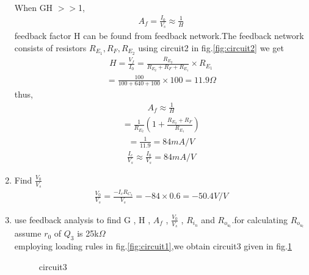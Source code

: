 \begin{enumerate}[label=\thesubsection.\arabic*.,ref=\thesubsection.\theenumi]
\\
\solution When GH $>>$1,
\begin{align}
    A_f =\frac{I_0}{V_s}\approx \frac{1}{H}
\end{align}
feedback factor H can be found from feedback network.The feedback network consists of resistors $R_E_1,R_F,R_E_2$
using circuit2 in  fig.\ref{fig:circuit2} we get
\begin{align}
    H=\frac{V_f}{I_0}=\frac{R_E_2}{R_E_2+R_F+R_E_1} \times R_E_1
\end{align}
\begin{align}
    =\frac{100}{100+640+100}\times 100=11.9\Omega
\end{align}
thus,
\begin{align}
    A_f\approx \frac{1}{H}
\end{align}
\begin{align}
    =\frac{1}{R_E_2}(1+\frac{R_E_2+R_F}{R_E_1})
\end{align}
\begin{align}
    =\frac{1}{11.9}=84mA/V
\end{align}
\begin{align}
\label{eq:eq1}
    \frac{I_c}{V_s}\approx\frac{I_0}{V_s}=84 mA/V
\end{align}
\item Find $\frac{V_0}{V_s}$
\\
\solution 
\begin{align}
\frac{V_0}{V_s}=\frac{-I_c R_C_3}{V_s}=-84\times0.6=-50.4V/V
\end{align}
\item use feedback analysis to find G , H , $A_f$ , $\frac{V_0}{V_s}$ , $R_i_n$ and $R_o_u_t$.for calculating $R_o_u_t$ assume $r_0$ of $Q_3$ is 25k$\Omega$
\\
\solution employing loading rules in fig.\ref{fig:circuit1},we obtain circuit3 given in fig.\ref{fig:circuit3}
 \begin{figure}[!ht]
	\begin{center}
		
		\resizebox{\columnwidth}{!}{}
	\end{center}
\caption{circuit3}
\label{fig:circuit3}
\end{figure}
\begin{figure}[!ht]
	\begin{center}
		

\end{center}
\end{figure}
\end{enumerate}
